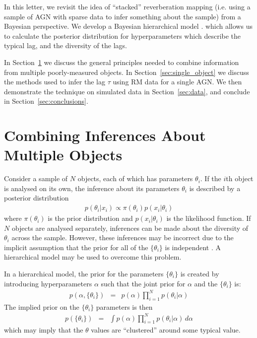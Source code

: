 \documentclass[useAMS,usenatbib]{mn2e}
\renewcommand{\btheta}{\{\theta_i\}}
\begin{document}
In this letter, we revisit the idea of ``stacked'' reverberation mapping (i.e.
using a sample of AGN with sparse data to infer something about the sample)
from a Bayesian perspective. We develop a Bayesian hierarchical model
\citep{loredo, kelly, extreme_deconvolution, 2012AJ....143...90S, 2012arXiv1208.3036L, 2013arXiv1310.5177B, 2013AJ....146....7B}.
which allows us to calculate the posterior distribution for hyperparameters
which describe the typical lag, and the diversity of the lags.

In Section~\ref{sec:multiple} we discuss the general principles needed
to combine information from multiple poorly-measured objects.
In Section~\ref{sec:single_object} we discuss the methods used to infer the lag
$\tau$ using RM data for a single AGN. We then demonstrate the technique
on simulated data in Section~\ref{sec:data}, and conclude in
Section~\ref{sec:conclusions}.

\section{Combining Inferences About Multiple Objects}\label{sec:multiple}
Consider a sample of $N$ objects, each of which has parameters $\theta_i$.
If the $i$th object is analysed on its own, the inference about 
its parameters $\theta_i$ is described by a posterior distribution
\begin{eqnarray}
p(\theta_i | x_i) \propto \pi(\theta_i)p(x_i | \theta_i)\label{eq:individual}
\end{eqnarray}
where $\pi(\theta_i)$ is the prior distribution and $p(x_i | \theta_i)$ is the
likelihood function. If $N$ objects are analysed separately, inferences can
be made about the diversity of $\theta_i$ across the sample. However, these
inferences may be incorrect due to the implicit assumption that the prior for
all of the $\btheta$ is independent \citep{2013arXiv1310.5177B}.
A hierarchical model may be used to overcome this problem.

In a hierarchical model, the prior for the parameters $\btheta$ is created
by introducing hyperparameters $\alpha$ such that the joint prior for $\alpha$
and the $\btheta$ is:
\begin{eqnarray}
p(\alpha, \btheta) &=& p(\alpha)\prod_{i=1}^N p(\theta_i | \alpha)
\end{eqnarray}
The implied prior on the $\btheta$ parameters is then
\begin{eqnarray}
p(\btheta) &=& \int p(\alpha)\prod_{i=1}^N p(\theta_i | \alpha) \, d\alpha
\end{eqnarray}
which may imply that the $\theta$ values are ``clustered'' around some
typical value.
\end{document}
